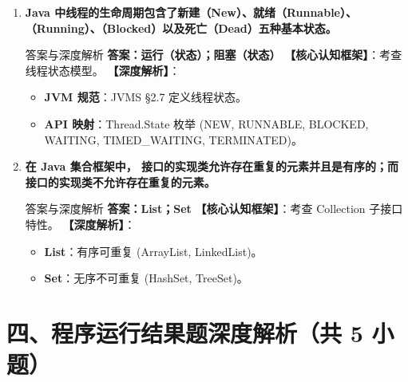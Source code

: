 ﻿\documentclass[12pt, a4paper]{ctexart}
\begin{document}
\begin{enumerate}[label=\textbf{\arabic*.}, leftmargin=*, itemsep=1.5em]
	\item \textbf{Java 中线程的生命周期包含了新建（New）、就绪（Runnable）、\underline{\hspace{3cm}}（Running）、\underline{\hspace{3cm}}（Blocked）以及死亡（Dead）五种基本状态。}
	      \begin{bluebox}{答案与深度解析}
		      \textbf{答案：运行（状态）；阻塞（状态）}
		      \textbf{【核心认知框架】}：考查线程状态模型。
		      \textbf{【深度解析】}：
		      \begin{itemize}[leftmargin=*, nosep]
			      \item \textbf{JVM 规范}：JVMS §2.7 定义线程状态。
			      \item \textbf{API 映射}：Thread.State 枚举 (NEW, RUNNABLE, BLOCKED, WAITING, TIMED\_WAITING, TERMINATED)。
		      \end{itemize}
	      \end{bluebox}

	\item \textbf{在 Java 集合框架中，\underline{\hspace{4cm}} 接口的实现类允许存在重复的元素并且是有序的；而 \underline{\hspace{4cm}} 接口的实现类不允许存在重复的元素。}
	      \begin{bluebox}{答案与深度解析}
		      \textbf{答案：List；Set}
		      \textbf{【核心认知框架】}：考查 Collection 子接口特性。
		      \textbf{【深度解析】}：
		      \begin{itemize}[leftmargin=*, nosep]
			      \item \textbf{List}：有序可重复 (ArrayList, LinkedList)。
			      \item \textbf{Set}：无序不可重复 (HashSet, TreeSet)。
		      \end{itemize}
	      \end{bluebox}
\end{enumerate}

\section*{四、程序运行结果题深度解析（共 5 小题）}
\end{document}
